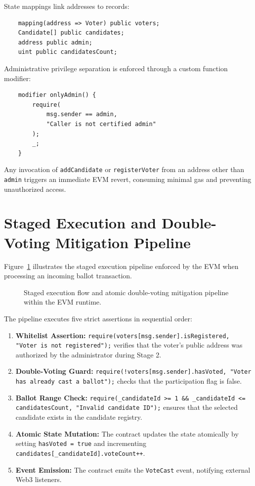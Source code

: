 \documentclass[12pt,a4paper]{report}
\begin{document}
State mappings link addresses to records:
\begin{verbatim}
    mapping(address => Voter) public voters;
    Candidate[] public candidates;
    address public admin;
    uint public candidatesCount;
\end{verbatim}

Administrative privilege separation is enforced through a custom function modifier:
\begin{verbatim}
    modifier onlyAdmin() {
        require(
            msg.sender == admin,
            "Caller is not certified admin"
        );
        _;
    }
\end{verbatim}
Any invocation of \texttt{addCandidate} or \texttt{registerVoter} from an address other than \texttt{admin} triggers an immediate EVM revert, consuming minimal gas and preventing unauthorized access.

\section{Staged Execution and Double-Voting Mitigation Pipeline}
Figure~\ref{fig:inference_flow} illustrates the staged execution pipeline enforced by the EVM when processing an incoming ballot transaction.

\begin{figure}[H]
\centering
{}
\caption{Staged execution flow and atomic double-voting mitigation pipeline within the EVM runtime.}
\label{fig:inference_flow}
\end{figure}

The pipeline executes five strict assertions in sequential order:
\begin{enumerate}
    \setlength{\itemsep}{1pt}
    \setlength{\parskip}{0pt}
    \item \textbf{Whitelist Assertion:} \texttt{require(voters[msg.sender].isRegistered, "Voter is not registered");} verifies that the voter's public address was authorized by the administrator during Stage 2.
    \item \textbf{Double-Voting Guard:} \texttt{require(!voters[msg.sender].hasVoted, "Voter has already cast a ballot");} checks that the participation flag is false.
    \item \textbf{Ballot Range Check:} \texttt{require(\_candidateId >= 1 \&\& \_candidateId <= candidatesCount, "Invalid candidate ID");} ensures that the selected candidate exists in the candidate registry.
    \item \textbf{Atomic State Mutation:} The contract updates the state atomically by setting \texttt{hasVoted = true} and incrementing \mbox{\texttt{candidates[\_candidateId].voteCount++}}.
    \item \textbf{Event Emission:} The contract emits the \texttt{VoteCast} event, notifying external Web3 listeners.
\end{enumerate}
\end{document}
